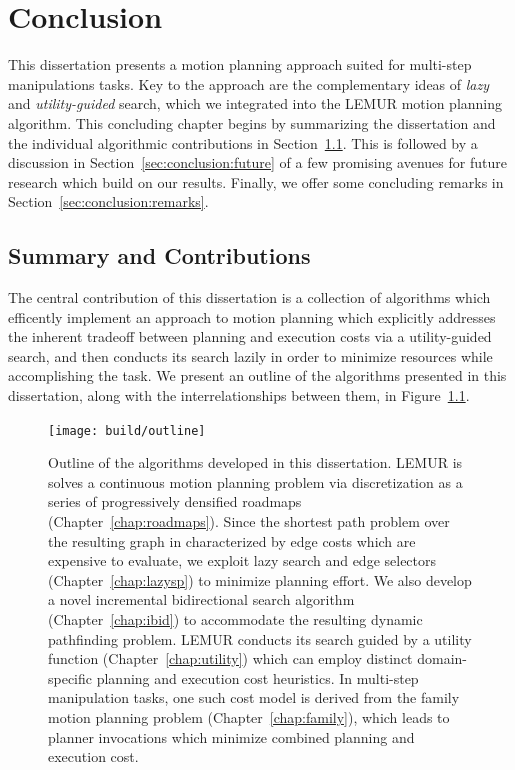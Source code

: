 \chapter{Conclusion}
\label{chap:conclusion}

This dissertation presents a motion planning approach suited for
multi-step manipulations tasks.
Key to the approach are the complementary ideas of \emph{lazy}
and \emph{utility-guided} search,
which we integrated into the LEMUR motion planning algorithm.
This concluding chapter begins by summarizing the dissertation
and the individual algorithmic contributions
in Section~\ref{sec:conclusion:summary}.
This is followed by a discussion in Section~\ref{sec:conclusion:future}
of a few promising avenues for future research
which build on our results.
Finally, we offer some concluding remarks
in Section~\ref{sec:conclusion:remarks}.

\section{Summary and Contributions}
\label{sec:conclusion:summary}

The central contribution of this dissertation is a collection of
algorithms which efficently implement an approach to motion planning
which explicitly addresses the inherent tradeoff between planning
and execution costs via a utility-guided search,
and then conducts its search lazily in order to minimize resources
while accomplishing the task.
We present an outline of the algorithms presented in this dissertation,
along with the interrelationships between them,
in Figure~\ref{fig:conclusion:outline}.

\begin{figure}
   \centering
   \texttt{[image: build/outline]}
   \caption{Outline of the algorithms developed in this dissertation.
      LEMUR is solves a continuous motion planning problem via
      discretization as a series of progressively densified roadmaps
      (Chapter~\ref{chap:roadmaps}).
      Since the shortest path problem over the resulting graph
      in characterized by edge costs which are expensive to evaluate,
      we exploit lazy search and edge selectors
      (Chapter~\ref{chap:lazysp}) to minimize planning effort.
      We also develop a novel incremental bidirectional search
      algorithm (Chapter~\ref{chap:ibid}) to accommodate the resulting
      dynamic pathfinding problem.
      LEMUR conducts its search guided by a utility function
      (Chapter~\ref{chap:utility}) which can employ distinct
      domain-specific planning and execution cost heuristics.
      In multi-step manipulation tasks,
      one such cost model is derived from the family motion planning
      problem (Chapter~\ref{chap:family}),
      which leads to planner invocations which minimize combined
      planning and execution cost.
      }
   \label{fig:conclusion:outline}
\end{figure}

